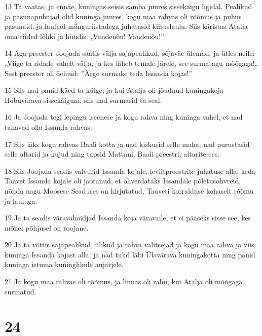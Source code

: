 \par 13 Ta vaatas, ja ennäe, kuningas seisis samba juures sissekäigu ligidal. Pealikud ja pasunapuhujad olid kuninga juures, kogu maa rahvas oli rõõmus ja puhus pasunaid, ja lauljad mänguriistadega juhatasid kiituslaulu. Siis käristas Atalja oma riided lõhki ja hüüdis: „Vandenõu! Vandenõu!”
\par 14 Aga preester Joojada saatis välja sajapealikud, sõjaväe ülemad, ja ütles neile: „Viige ta ridade vahelt välja, ja kes läheb temale järele, see surmatagu mõõgaga!„ Sest preester oli öelnud: ”Ärge surmake teda Issanda kojas!”
\par 15 Siis nad panid käed ta külge; ja kui Atalja oli jõudnud kuningakoja Hobuvärava sissekäiguni, siis nad surmasid ta seal.
\par 16 Ja Joojada tegi lepingu iseenese ja kogu rahva ning kuninga vahel, et nad tahavad olla Issanda rahvas.
\par 17 Siis läks kogu rahvas Baali kotta ja nad kiskusid selle maha; nad purustasid selle altarid ja kujud ning tapsid Mattani, Baali preestri, altarite ees.
\par 18 Siis Joojada seadis valvurid Issanda kojale, leviitpreestrite juhatuse alla, keda Taavet Issanda kojale oli jaotanud, et ohverdataks Issandale põletusohvreid, nõnda nagu Moosese Seaduses on kirjutatud, Taaveti korralduse kohaselt rõõmu ja lauluga.
\par 19 Ja ta seadis väravahoidjad Issanda koja väravaile, et ei pääseks sisse see, kes mõnel põhjusel on roojane.
\par 20 Ja ta võttis sajapealikud, ülikud ja rahva valitsejad ja kogu maa rahva ja viis kuninga Issanda kojast alla; ja nad tulid läbi Ülavärava kuningakotta ning panid kuninga istuma kuninglikule aujärjele.
\par 21 Ja kogu maa rahvas oli rõõmus, ja linnas oli rahu, kui Atalja oli mõõgaga surmatud.

\chapter{24}


